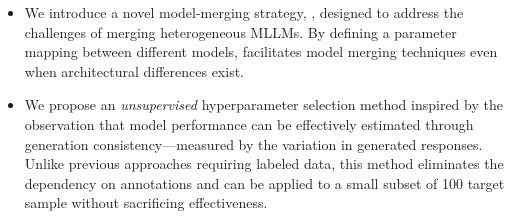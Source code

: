 \begin{itemize}




    \item We introduce a novel model-merging strategy, \ours, designed to address the challenges of merging heterogeneous MLLMs. By defining a parameter mapping between different models, \ours facilitates model merging techniques even when architectural differences exist.

    \item We propose an \textit{unsupervised} hyperparameter selection method inspired by the observation that model performance can be effectively estimated through generation consistency—measured by the variation in generated responses. Unlike previous approaches requiring labeled data, this method eliminates the dependency on annotations and can be applied to a small subset of 100 target sample without sacrificing effectiveness.


\end{itemize}
